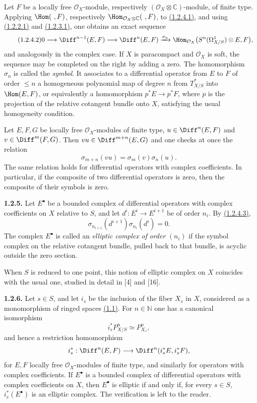 Let $F$ be a locally free $\mathcal O_X$-module, respectively $(\mathcal O_X\otimes\mathbb C)$-module, of finite type. Applying $\Hom(\ ,F)$, respectively $\Hom_{\mathcal O_X\otimes\mathbb C}(\ ,F)$, to \hyperlink{sga6.e02.eq.1-2-4-1}{(1.2.4.1)}, and using \hyperlink{sga6.e02.eq.1-2-2-1}{(1.2.2.1)} and \hyperlink{sga6.e02.eq.1-2-3-1}{(1.2.3.1)}, one obtains an exact sequence
\begin{equation}\tag{1.2.4.2}
0\longrightarrow \Diff^{n-1}(E,F)\longrightarrow \Diff^n(E,F)
\xrightarrow{\sigma_n}
\Hom_{\mathcal O_X}\bigl(S^n(\Omega^1_{X/S})\otimes E,F\bigr),
\end{equation}
and analogously in the complex case. If $X$ is paracompact and $\mathcal O_X$ is soft, the sequence may be completed on the right by adding a zero. The homomorphism $\sigma_n$ is called the \emph{symbol}. It associates to a differential operator from $E$ to $F$ of order $\le n$ a homogeneous polynomial map of degree $n$ from $T^*_{X/S}$ into $\Hom(E,F)$, or equivalently a homomorphism $p^*E\to p^*F$, where $p$ is the projection of the relative cotangent bundle onto $X$, satisfying the usual homogeneity condition.

Let $E,F,G$ be locally free $\mathcal O_X$-modules of finite type, $u\in\Diff^n(E,F)$ and $v\in\Diff^m(F,G)$. Then $vu\in\Diff^{m+n}(E,G)$ and one checks at once the relation
\begin{equation}\tag{1.2.4.3}
 \sigma_{m+n}(vu)=\sigma_m(v)\sigma_n(u).
\end{equation}
The same relation holds for differential operators with complex coefficients. In particular, if the composite of two differential operators is zero, then the composite of their symbols is zero.

\textbf{1.2.5.} Let $E^\bullet$ be a bounded complex of differential operators with complex coefficients on $X$ relative to $S$, and let $d^i:E^i\to E^{i+1}$ be of order $n_i$. By \hyperlink{sga6.e02.eq.1-2-4-3}{(1.2.4.3)},
\[
 \sigma_{n_{i+1}}(d^{i+1})\sigma_{n_i}(d^i)=0.
\]
The complex $E^\bullet$ is called an \emph{elliptic complex of order $(n_i)$} if the symbol complex on the relative cotangent bundle, pulled back to that bundle, is acyclic outside the zero section.

When $S$ is reduced to one point, this notion of elliptic complex on $X$ coincides with the usual one, studied in detail in [4] and [16].

\textbf{1.2.6.} Let $s\in S$, and let $i_s$ be the inclusion of the fiber $X_s$ in $X$, considered as a monomorphism of ringed spaces \hyperlink{sga6.e02.sec.1.1}{(1.1)}. For $n\in\mathbb N$ one has a canonical isomorphism
\[
 i_s^*P^n_{X/S}\simeq P^n_{X_s},
\]
and hence a restriction homomorphism
\[
 i_s^*:\Diff^n(E,F)\longrightarrow \Diff^n(i_s^*E,i_s^*F),
\]
for $E,F$ locally free $\mathcal O_X$-modules of finite type, and similarly for operators with complex coefficients. If $E^\bullet$ is a bounded complex of differential operators with complex coefficients on $X$, then $E^\bullet$ is elliptic if and only if, for every $s\in S$, $i_s^*(E^\bullet)$ is an elliptic complex. The verification is left to the reader.

